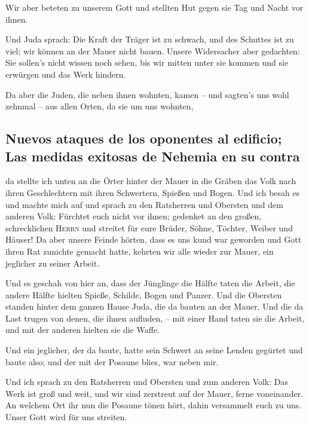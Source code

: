  Wir aber beteten zu unserem Gott und stellten Hut gegen
sie Tag und Nacht vor ihnen.

 Und Juda sprach: Die Kraft der Träger ist zu schwach, und
des Schuttes ist zu viel; wir können an der Mauer nicht bauen.
 Unsere Widersacher aber gedachten: Sie sollen's nicht
wissen noch sehen, bis wir mitten unter sie kommen und sie erwürgen und
das Werk hindern.

 Da aber die Juden, die neben ihnen wohnten, kamen -- und
sagten's uns wohl zehnmal -- aus allen Orten, da sie um uns wohnten,

\hypertarget{nuevos-ataques-de-los-oponentes-al-edificio-las-medidas-exitosas-de-nehemia-en-su-contra}{%
\subsection{Nuevos ataques de los oponentes al edificio; Las medidas
exitosas de Nehemia en su
contra}\label{nuevos-ataques-de-los-oponentes-al-edificio-las-medidas-exitosas-de-nehemia-en-su-contra}}

 da stellte ich unten an die Örter hinter der Mauer in die
Gräben das Volk nach ihren Geschlechtern mit ihren Schwertern, Spießen
und Bogen.  Und ich besah es und machte mich auf und
sprach zu den Ratsherren und Obersten und dem anderen Volk: Fürchtet
euch nicht vor ihnen; gedenket an den großen, schrecklichen
\textsc{Herrn} und streitet für eure Brüder, Söhne, Töchter, Weiber und
Häuser!  Da aber unsere Feinde hörten, dass es uns kund
war geworden und Gott ihren Rat zunichte gemacht hatte, kehrten wir alle
wieder zur Mauer, ein jeglicher zu seiner Arbeit.

 Und es geschah von hier an, dass der Jünglinge die
Hälfte taten die Arbeit, die andere Hälfte hielten Spieße, Schilde,
Bogen und Panzer. Und die Obersten standen hinter dem ganzen Hause Juda,
 die da bauten an der Mauer. Und die da Last trugen von
denen, die ihnen aufluden, -- mit einer Hand taten sie die Arbeit, und
mit der anderen hielten sie die Waffe.

 Und ein jeglicher, der da baute, hatte sein Schwert an
seine Lenden gegürtet und baute also; und der mit der Posaune blies, war
neben mir.

 Und ich sprach zu den Ratsherren und Obersten und zum
anderen Volk: Das Werk ist groß und weit, und wir sind zerstreut auf der
Mauer, ferne voneinander.  An welchem Ort ihr nun die
Posaune tönen hört, dahin versammelt euch zu uns. Unser Gott wird für
uns streiten.

